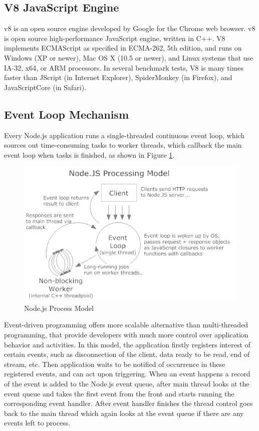 \subsection{V8 JavaScript Engine} %
\label{sub:v8_javascript_engine}
\glsdesc{v8} is an open source engine developed by Google for the Chrome web browser. \gls{v8} is open source high-performance JavaScript engine, written in C++. V8 implements ECMAScript as specified in ECMA-262, 5th edition, and runs on Windows (XP or newer), Mac OS X (10.5 or newer), and Linux systems that use IA-32, x64, or ARM processors. In several benchmark tests, V8 is many times faster than JScript (in Internet Explorer), SpiderMonkey (in Firefox), and JavaScriptCore (in Safari).\cite{google_v8}
\subsection{Event Loop Mechanism} %
\label{sub:event_loop_mechanism}
Every Node.js application runs a single-threaded continuous event loop, which sources out time-consuming tasks to worker threads, which callback the main event loop when tasks is finished, as shown in Figure \ref{fig:node_js_model}.
\begin{figure}[H]
\begin{center}
\captionsetup{font=small}
\includegraphics[scale=0.8]{pics/node_js_model.png}
\caption{Node.js Process Model\cite{node_js_pic}}
\label{fig:node_js_model}
\end{center}
\end{figure}
Event-driven programming offers more scalable alternative than multi-threaded programming, that provide developers with much more control over application behavior and activities. In this model, the application firstly registers interest of certain events, such as disconnection of the client, data ready to be read, end of stream, etc. Then application waits to be notified of occurrence in these registered events, and can act upon triggering. \cite{7073454} When an event happens a record of the event is added to the Node.js event queue, after main thread looks at the event queue and takes the first event from the front and starts running the corresponding event handler. After event handler finishes the thread control goes back to the main thread which again looks at the event queue if there are any events left to process.\cite{5617064}
